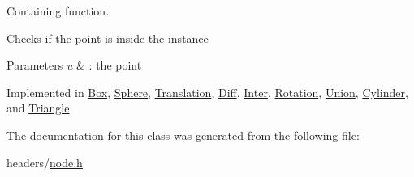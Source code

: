 \-Containing function. 

\-Checks if the point is inside the instance


\begin{DoxyParams}{\-Parameters}
{\em u} & \-: the point \\
\hline
\end{DoxyParams}


\-Implemented in \hyperlink{class_box_afb71788385a4f8ff91c6d8385972dde4}{\-Box}, \hyperlink{class_sphere_abccfe78233b90c14e6e2afe74e27e6d5}{\-Sphere}, \hyperlink{class_translation_a23217f05d1442f4f5fc7db511dd57434}{\-Translation}, \hyperlink{class_diff_a9569764d64e3cc072c554ceffad7934a}{\-Diff}, \hyperlink{class_inter_a62fb756b8848c042f6ea48bbe204f4a6}{\-Inter}, \hyperlink{class_rotation_a1dbfa88ef89ea7bd50a875ca7fe9f911}{\-Rotation}, \hyperlink{class_union_ae9430083fcfdc62199b26db6e511d150}{\-Union}, \hyperlink{class_cylinder_a54d8f47f574488e583868fbd5dfd9abf}{\-Cylinder}, and \hyperlink{class_triangle_ab6066a8828559d40c1f88dfcf92723bb}{\-Triangle}.



\-The documentation for this class was generated from the following file\-:\begin{DoxyCompactItemize}
\item 
headers/\hyperlink{node_8h}{node.\-h}\end{DoxyCompactItemize}

